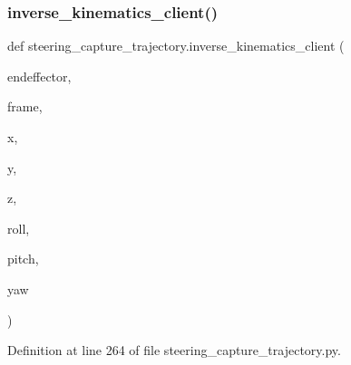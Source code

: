 \mbox{\label{namespacesteering__capture__trajectory_a4bfce21cb55ab2e49bfd284ede718f63}} 
\subsubsection{\texorpdfstring{inverse\_kinematics\_client()}{inverse\_kinematics\_client()}}
{\footnotesize\ttfamily def steering\+\_\+capture\+\_\+trajectory.\+inverse\+\_\+kinematics\+\_\+client (\begin{DoxyParamCaption}\item[{}]{endeffector,  }\item[{}]{frame,  }\item[{}]{x,  }\item[{}]{y,  }\item[{}]{z,  }\item[{}]{roll,  }\item[{}]{pitch,  }\item[{}]{yaw }\end{DoxyParamCaption})}



Definition at line 264 of file steering\+\_\+capture\+\_\+trajectory.\+py.


